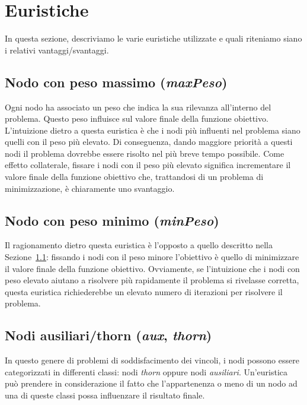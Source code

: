 \section{Euristiche}\label{sec:euristiche}

In questa sezione, descriviamo le varie euristiche utilizzate e quali riteniamo siano i relativi vantaggi/svantaggi.

\subsection{Nodo con peso massimo (\textit{maxPeso})}\label{subsec:nodo_peso_massimo}

Ogni nodo ha associato un peso che indica la sua rilevanza all'interno del problema. Questo peso influisce sul valore finale della funzione obiettivo. L'intuizione dietro a questa euristica è che i nodi più influenti nel problema siano quelli con il peso più elevato. Di conseguenza, dando maggiore priorità a questi nodi il problema dovrebbe essere risolto nel più breve tempo possibile. Come effetto collaterale, fissare i nodi con il peso più elevato significa incrementare il valore finale della funzione obiettivo che, trattandosi di un problema di minimizzazione, è chiaramente uno svantaggio.

\subsection{Nodo con peso minimo (\textit{minPeso})}\label{subsec:nodo_peso_minimo}

Il ragionamento dietro questa euristica è l'opposto a quello descritto nella Sezione~\ref{subsec:nodo_peso_massimo}: fissando i nodi con il peso minore l'obiettivo è quello di minimizzare il valore finale della funzione obiettivo. Ovviamente, se l'intuizione che i nodi con peso elevato aiutano a risolvere più rapidamente il problema si rivelasse corretta, questa euristica richiederebbe un elevato numero di iterazioni per risolvere il problema.

\subsection{Nodi ausiliari/thorn (\textit{aux}, \textit{thorn})}\label{subsec:nodi}

In questo genere di problemi di soddisfacimento dei vincoli, i nodi possono essere categorizzati in differenti classi: nodi \textit{thorn} oppure nodi \textit{ausiliari}. Un'euristica può prendere in considerazione il fatto che l'appartenenza o meno di un nodo ad una di queste classi possa influenzare il risultato finale.

